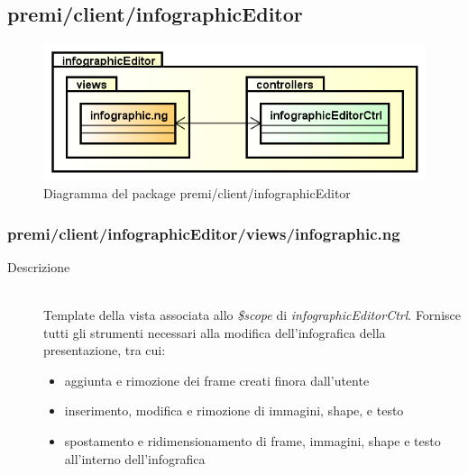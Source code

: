 \clearpage
\subsection{premi/client/infographicEditor}
\begin{figure}[h]
\begin{center}
\includegraphics[scale=0.55]{img/diapkg/infographicEditor.png}
\caption{Diagramma del package premi/client/infographicEditor}
\end{center}
\end{figure}



\subsubsection{premi/client/infographicEditor/views/infographic.ng}

\begin{description}
\item[Descrizione] \hfill \\
	Template della vista associata allo \textit{\$scope} di \textit{infographicEditorCtrl}. Fornisce tutti gli strumenti necessari alla modifica dell'infografica della presentazione, tra cui:
	\begin{itemize}
			\item aggiunta e rimozione dei frame creati finora dall'utente
			\item inserimento, modifica e rimozione di immagini, shape, e testo
			\item spostamento e ridimensionamento di frame, immagini, shape  e testo all'interno dell'infografica
	\end{itemize}
\end{description}



















